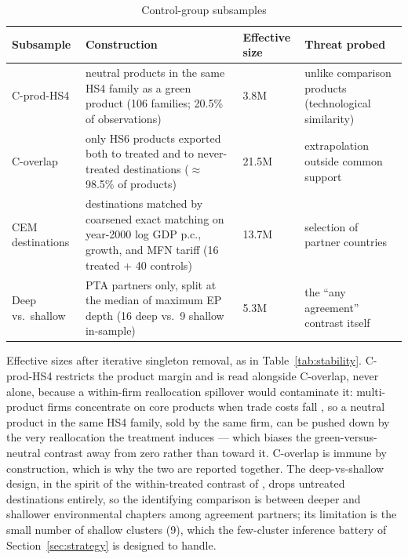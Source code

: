 \documentclass[12pt]{article}
\begin{document}
\begin{table}[htbp]
\centering
\caption{Control-group subsamples}
\label{tab:samples}
\small
\begin{threeparttable}
\begin{tabular}{p{3.1cm}p{5.6cm}p{1.8cm}p{3.6cm}}
\toprule
Subsample & Construction & Effective size & Threat probed \\
\midrule
C-prod-HS4 & neutral products in the same HS4 family as a green product
(106 families; 20.5\% of observations) & 3.8M & unlike comparison products
(technological similarity) \\
\addlinespace
C-overlap & only HS6 products exported both to treated and to never-treated
destinations ($\approx$98.5\% of products) & 21.5M & extrapolation outside common
support \\
\addlinespace
CEM destinations & destinations matched by coarsened exact matching on year-2000
log GDP p.c., growth, and MFN tariff (16 treated + 40 controls) & 13.7M &
selection of partner countries \\
\addlinespace
Deep vs.\ shallow & PTA partners only, split at the median of maximum EP depth
(16 deep vs.\ 9 shallow in-sample) & 5.3M & the ``any agreement'' contrast
itself \\
\bottomrule
\end{tabular}
\begin{tablenotes}\footnotesize
\item Effective sizes after iterative singleton removal, as in
Table~\ref{tab:stability}. C-prod-HS4 restricts the product margin and is read
alongside C-overlap, never alone, because a within-firm reallocation spillover would
contaminate it: multi-product firms concentrate on core products when trade costs fall
\citep{eckel2010}, so a neutral product in the same HS4 family, sold by the same firm,
can be pushed down by the very reallocation the treatment induces --- which biases the
green-versus-neutral contrast away from zero rather than toward it. C-overlap is immune
by construction, which is why the two are reported together. The deep-vs-shallow design, in the spirit of
the within-treated contrast of \citet{abman2024}, drops untreated destinations
entirely, so the identifying comparison is between deeper and shallower
environmental chapters among agreement partners; its limitation is the small number
of shallow clusters (9), which the few-cluster inference battery of
Section~\ref{sec:strategy} is designed to handle.
\end{tablenotes}
\end{threeparttable}
\end{table}
\end{document}
